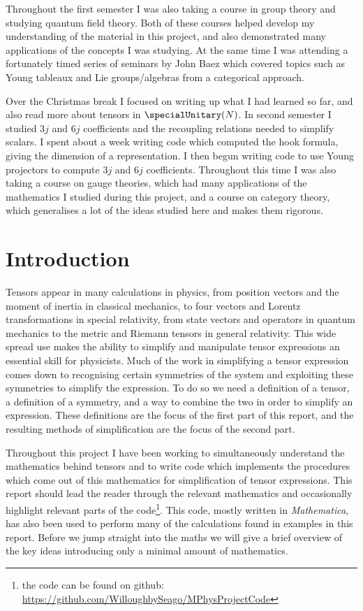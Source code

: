 \documentclass[fleqn]{NotesClass}
\newcommand{\Mathematica}{\textit{Mathematica}}
\begin{document}
    Throughout the first semester I was also taking a course in group theory and studying quantum field theory.
    Both of these courses helped develop my understanding of the material in this project, and also demonstrated many applications of the concepts I was studying.
    At the same time I was attending a fortunately timed series of seminars by John Baez \cite{baez} which covered topics such as Young tableaux and Lie groups/algebras from a categorical approach.
    
    Over the Christmas break I focused on writing up what I had learned so far, and also read more about tensors in \(\specialUnitary(N)\).
    In second semester I studied \(3j\) and \(6j\) coefficients and the recoupling relations needed to simplify scalars.
    I spent about a week writing code which computed the hook formula, giving the dimension of a representation.
    I then begun writing code to use Young projectors to compute \(3j\) and \(6j\) coefficients.
    Throughout this time I was also taking a course on gauge theories, which had many applications of the mathematics I studied during this project, and a course on category theory, which generalises a lot of the ideas studied here and makes them rigorous.
    
    \mainmatter
    
    \chapter{Introduction}
    Tensors appear in many calculations in physics, from position vectors and the moment of inertia in classical mechanics, to four vectors and Lorentz transformations in special relativity, from state vectors and operators in quantum mechanics to the metric and Riemann tensors in general relativity.
    This wide spread use makes the ability to simplify and manipulate tensor expressions an essential skill for physicists.
    Much of the work in simplifying a tensor expression comes down to recognising certain symmetries of the system and exploiting these symmetries to simplify the expression.
    To do so we need a definition of a tensor, a definition of a symmetry, and a way to combine the two in order to simplify an expression.
    These definitions are the focus of the first part of this report, and the resulting methods of simplification are the focus of the second part.
    
    Throughout this project I have been working to simultaneously understand the mathematics behind tensors and to write code which implements the procedures which come out of this mathematics for simplification of tensor expressions.
    This report should lead the reader through the relevant mathematics and occasionally highlight relevant parts of the code\footnote{the code can be found on github: \url{https://github.com/WilloughbySeago/MPhysProjectCode}}.
    This code, mostly written in \Mathematica{}, has also been used to perform many of the calculations found in examples in this report.
    Before we jump straight into the maths we will give a brief overview of the key ideas introducing only a minimal amount of mathematics.
    
\end{document}
